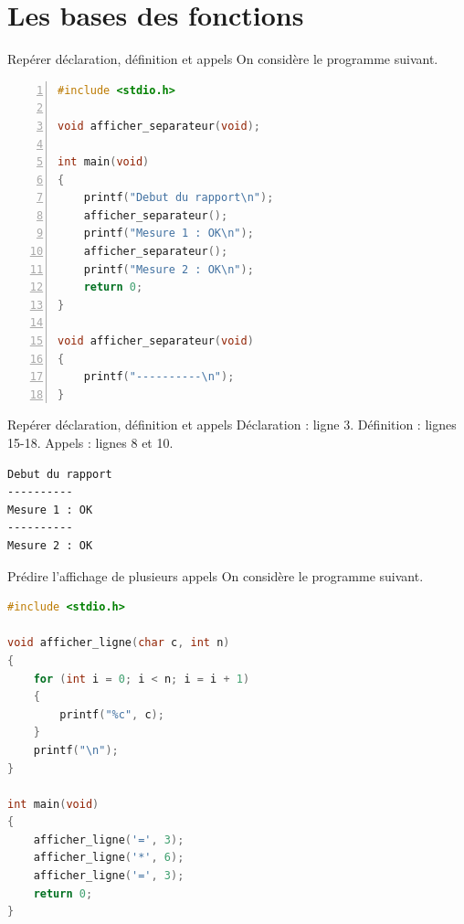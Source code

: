 \section{Les bases des fonctions}

\begin{UPSTIexercice}{Repérer déclaration, définition et appels}
    On considère le programme suivant.
    \begin{lstlisting}[language=C, numbers=left]
#include <stdio.h>

void afficher_separateur(void);

int main(void)
{
    printf("Debut du rapport\n");
    afficher_separateur();
    printf("Mesure 1 : OK\n");
    afficher_separateur();
    printf("Mesure 2 : OK\n");
    return 0;
}

void afficher_separateur(void)
{
    printf("----------\n");
}
    \end{lstlisting}
\end{UPSTIexercice}

\begin{UPSTIprofOnlyEnv}
    \begin{UPSTIcorrectionP}{Repérer déclaration, définition et appels}
        Déclaration : ligne 3. Définition : lignes 15-18. Appels : lignes 8 et 10.
        \begin{lstlisting}[language=bash,style=console]
Debut du rapport
----------
Mesure 1 : OK
----------
Mesure 2 : OK
        \end{lstlisting}
    \end{UPSTIcorrectionP}
\end{UPSTIprofOnlyEnv}


\begin{UPSTIexercice}{Prédire l'affichage de plusieurs appels}
    On considère le programme suivant.
    \begin{lstlisting}[language=C]
#include <stdio.h>

void afficher_ligne(char c, int n)
{
    for (int i = 0; i < n; i = i + 1)
    {
        printf("%c", c);
    }
    printf("\n");
}

int main(void)
{
    afficher_ligne('=', 3);
    afficher_ligne('*', 6);
    afficher_ligne('=', 3);
    return 0;
}
    \end{lstlisting}
\end{UPSTIexercice}

